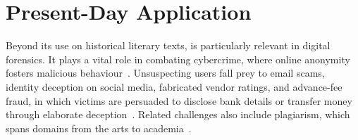 \section{Present-Day Application} %

Beyond its use on historical literary texts, \ai{} is particularly relevant in digital forensics.
It plays a vital role in combating cybercrime, where online anonymity fosters malicious behaviour~\citep{abbasi_writeprints_2008}.
Unsuspecting users fall prey to email scams, identity deception on social media, fabricated vendor ratings, and advance-fee fraud, in which victims are persuaded to disclose bank details or transfer money through elaborate deception~\citep{abbasi_writeprints_2008,neal_surveying_2018}.
Related challenges also include plagiarism, which spans domains from the arts to academia~\citep{neal_surveying_2018}.